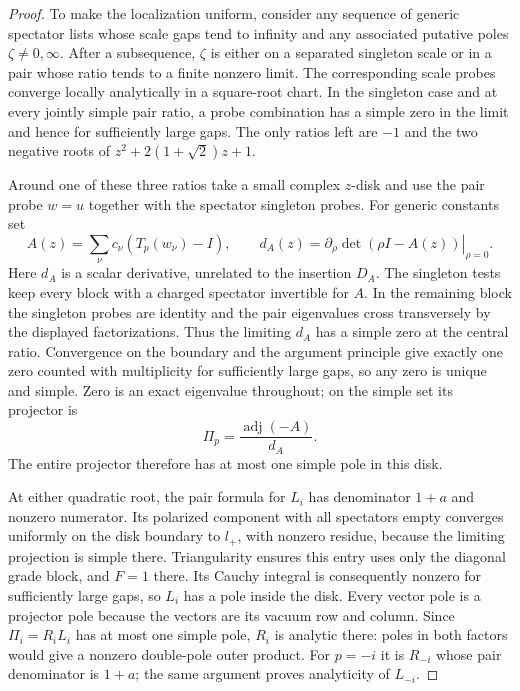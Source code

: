 \begin{proof}
To make the localization uniform, consider any sequence of generic
spectator lists whose scale gaps tend to infinity and any associated
putative poles $\zeta\ne0,\infty$. After a subsequence, $\zeta$ is
either on a separated singleton scale or in a pair whose ratio tends
to a finite nonzero limit. The corresponding scale probes converge
locally analytically in a square-root chart. In the singleton case
and at every jointly simple pair ratio, a probe combination has a
simple zero in the limit and hence for sufficiently large gaps.
The only ratios left are $-1$ and the two negative roots of
$z^2+2(1+\sqrt2)z+1$.

Around one of these three ratios take a small complex $z$-disk and
use the pair probe $w=u$ together with the spectator singleton probes.
For generic constants set
\[
A(z)=\sum_\nu c_\nu(T_p(w_\nu)-I),\qquad
d_A(z)=\left.\partial_\rho\det(\rho I-A(z))\right|_{\rho=0}.
\]
Here $d_A$ is a scalar derivative, unrelated to the insertion $D_A$.
The singleton tests keep every block with a charged spectator
invertible for $A$. In the remaining block the singleton probes are
identity and the pair eigenvalues cross transversely by the displayed
factorizations. Thus the limiting $d_A$ has a simple zero at the
central ratio. Convergence on the boundary and the argument principle
give exactly one zero counted with multiplicity for sufficiently large
gaps, so any zero is unique and simple. Zero is an exact eigenvalue throughout;
on the simple set its projector is
\[
\Pi_p=\frac{\operatorname{adj}(-A)}{d_A}.
\]
The entire projector therefore has at most one simple pole in this
disk.

At either quadratic root, the pair formula for $L_i$ has denominator
$1+a$ and nonzero numerator. Its polarized component with all
spectators empty converges uniformly on the disk boundary to $l_+$,
with nonzero residue, because the limiting projection is simple there.
Triangularity ensures this entry uses only the diagonal grade block,
and $F=1$ there. Its Cauchy integral is consequently
nonzero for sufficiently large gaps, so $L_i$ has a pole inside the
disk. Every vector pole is a projector pole because the vectors are its
vacuum row and column. Since $\Pi_i=R_iL_i$ has at most one simple pole,
$R_i$ is analytic there: poles in both factors would give a nonzero
double-pole outer product. For $p=-i$ it is $R_{-i}$ whose pair denominator is
$1+a$; the same argument proves analyticity of $L_{-i}$.


\end{proof}
